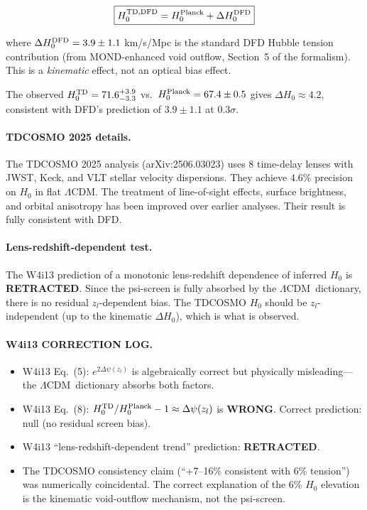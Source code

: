 \documentclass[11pt,a4paper]{article}
\newcommand{\LCDM}{$\Lambda$CDM}
\newcommand{\Dpsi}{\Delta\psi}
\begin{document}
\begin{equation}
\boxed{
H_0^{\rm TD, DFD} = H_0^{\rm Planck} + \Delta H_0^{\rm DFD}
}
\end{equation}

where $\Delta H_0^{\rm DFD} = 3.9 \pm 1.1$ km/s/Mpc is the standard
DFD Hubble tension contribution (from MOND-enhanced void outflow,
Section~5 of the formalism).  This is a \emph{kinematic} effect, not
an optical bias effect.

The observed $H_0^{\rm TD} = 71.6^{+3.9}_{-3.3}$ vs.\ $H_0^{\rm Planck}
= 67.4 \pm 0.5$ gives $\Delta H_0 \approx 4.2$, consistent with
DFD's prediction of $3.9 \pm 1.1$ at $0.3\sigma$.

\paragraph{TDCOSMO 2025 details.}
The TDCOSMO 2025 analysis (arXiv:2506.03023) uses 8 time-delay lenses
with JWST, Keck, and VLT stellar velocity dispersions. They achieve 4.6\%
precision on $H_0$ in flat \LCDM.  The treatment of line-of-sight effects,
surface brightness, and orbital anisotropy has been improved over earlier
analyses.  Their result is fully consistent with DFD.

\paragraph{Lens-redshift-dependent test.}
The W4i13 prediction of a monotonic lens-redshift dependence of inferred
$H_0$ is \textbf{RETRACTED}.  Since the psi-screen is fully absorbed by
the \LCDM\ dictionary, there is no residual $z_l$-dependent bias.  The
TDCOSMO $H_0$ should be $z_l$-independent (up to the kinematic $\Delta H_0$),
which is what is observed.

\paragraph{W4i13 CORRECTION LOG.}
\begin{itemize}
\item W4i13 Eq.~(5): $e^{2\Dpsi(z_l)}$ is algebraically correct but
  physically misleading---the \LCDM\ dictionary absorbs both factors.
\item W4i13 Eq.~(8): $H_0^{\rm TD}/H_0^{\rm Planck} - 1 \approx \Dpsi(z_l)$
  is \textbf{WRONG}.  Correct prediction: null (no residual screen bias).
\item W4i13 ``lens-redshift-dependent trend'' prediction: \textbf{RETRACTED}.
\item The TDCOSMO consistency claim (``+7--16\% consistent with 6\% tension'')
  was numerically coincidental.  The correct explanation of the 6\% $H_0$
  elevation is the kinematic void-outflow mechanism, not the psi-screen.
\end{itemize}
\end{document}
